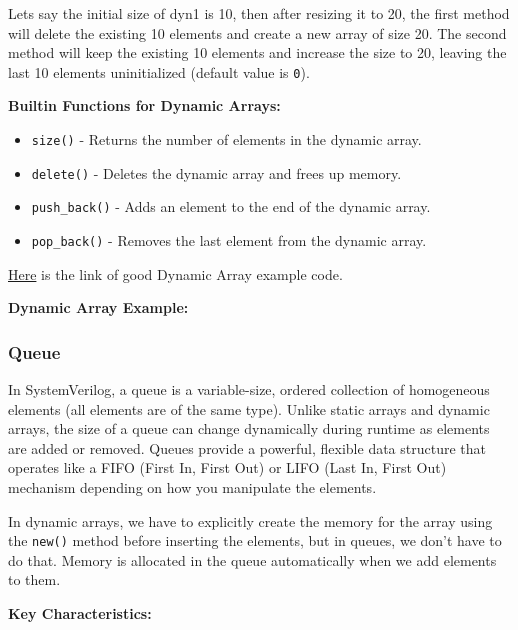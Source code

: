 \documentclass[12pt, a4paper]{article}
\begin{document}
Lets say the initial size of dyn1 is 10, then after resizing it to 20, the first method will delete the existing 10 elements and create a new array of size 20. The second method will keep the existing 10 elements and increase the size to 20, leaving the last 10 elements uninitialized (default value is \texttt{0}).
\vspace{1em}

\textbf{Builtin  Functions for Dynamic Arrays:}
\begin{itemize}[nosep]
    \item \texttt{size()} - Returns the number of elements in the dynamic array.
    \item \texttt{delete()} - Deletes the dynamic array and frees up memory.
    \item \texttt{push\_back()} - Adds an element to the end of the dynamic array.
    \item \texttt{pop\_back()} - Removes the last element from the dynamic array.
\end{itemize}

\vspace{0.5em}

\href{https://vlsiverify.com/system-verilog/dynamic-array-in-sv/}{Here}
 is the link of good Dynamic Array example code.

\textbf{Dynamic Array Example:}



\subsubsection{Queue}
In SystemVerilog, a queue is a variable-size, ordered collection of homogeneous elements (all elements are of the same type). Unlike static arrays and dynamic arrays, the size of a queue can change dynamically during runtime as elements are added or removed. Queues provide a powerful, flexible data structure that operates like a FIFO (First In, First Out) or LIFO (Last In, First Out) mechanism depending on how you manipulate the elements.

\vspace{0.5em}

In dynamic arrays, we have to explicitly create the memory for the array using the \texttt{new()} method before inserting the elements, but in queues, we don't have to do that. Memory is allocated in the queue automatically when we add elements to them.

\textbf{Key Characteristics:}
\end{document}

